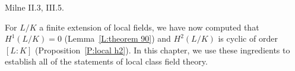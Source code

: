%
%
%
%
%
%
%

 Milne II.3, III.5.

\medskip

For $L/K$ a finite extension of local fields, we have now computed that
$H^1(L/K) = 0$ (Lemma~\ref{L:theorem 90})
and $H^2(L/K)$ is cyclic of order $[L:K]$ (Proposition~\ref{P:local h2}).
In this chapter, we use these ingredients to establish all of the statements of local class field theory.


